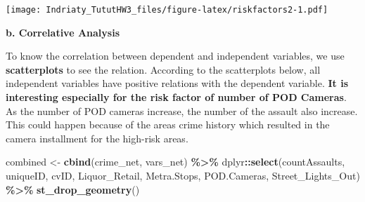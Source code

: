 \documentclass[
]{article}
\newenvironment{Shaded}{\begin{snugshade}}{\end{snugshade}}
\newcommand{\FunctionTok}[1]{\textcolor[rgb]{0.13,0.29,0.53}{\textbf{#1}}}
\newcommand{\NormalTok}[1]{#1}
\newcommand{\OtherTok}[1]{\textcolor[rgb]{0.56,0.35,0.01}{#1}}
\newcommand{\SpecialCharTok}[1]{\textcolor[rgb]{0.81,0.36,0.00}{\textbf{#1}}}
\begin{document}
\texttt{[image: Indriaty\_TututHW3\_files/figure-latex/riskfactors2-1.pdf]}

\textbf{b. Correlative Analysis}

To know the correlation between dependent and independent variables, we
use \textbf{scatterplots} to see the relation. According to the
scatterplots below, all independent variables have positive relations
with the dependent variable. \textbf{It is interesting especially for
the risk factor of number of POD Cameras}. As the number of POD cameras
increase, the number of the assault also increase. This could happen
because of the areas crime history which resulted in the camera
installment for the high-risk areas.

\begin{Shaded}
\begin{Highlighting}[]
\NormalTok{combined }\OtherTok{\textless{}{-}} \FunctionTok{cbind}\NormalTok{(crime\_net, vars\_net) }\SpecialCharTok{\%\textgreater{}\%}
\NormalTok{            dplyr}\SpecialCharTok{::}\FunctionTok{select}\NormalTok{(countAssaults, uniqueID, cvID, Liquor\_Retail,}
\NormalTok{                          Metra.Stops, POD.Cameras, Street\_Lights\_Out) }\SpecialCharTok{\%\textgreater{}\%}
            \FunctionTok{st\_drop\_geometry}\NormalTok{()}


\end{Highlighting}
\end{Shaded}
\end{document}
